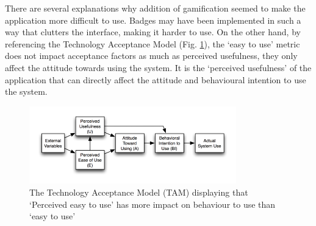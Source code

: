 	There are several explanations why addition of gamification seemed to make the application more difficult to use. Badges may have been implemented in such a way that clutters the interface, making it harder to use. On the other hand, by referencing the Technology Acceptance Model (Fig. \ref{fig:TAMagain}), the `easy to use' metric does not impact acceptance factors as much as perceived usefulness, they only affect the attitude towards using the system.  It is the `perceived usefulness' of the application that can directly affect the attitude and behavioural intention to use the system.
    \begin{figure}[H]
 \centering
  \includegraphics[width=0.80\textwidth]{img/TAM.png}
     \caption{The Technology Acceptance Model (TAM) displaying that `Perceived easy to use' has more impact on behaviour to use than `easy to use'}
     \label{fig:TAMagain}
\end{figure}

